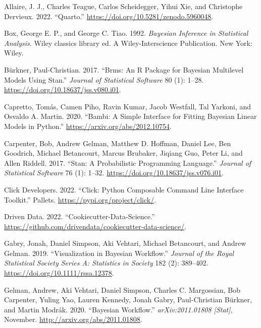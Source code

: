 \documentclass[
  letterpaper,
  DIV=11,
  numbers=noendperiod]{scrartcl}
\newlength{\cslhangindent}
\newenvironment{CSLReferences}[2] %
 {\begin{list}{}{%
  \setlength{\itemindent}{0pt}
  \setlength{\leftmargin}{0pt}
  \setlength{\parsep}{0pt}
  \ifodd #1
   \setlength{\leftmargin}{\cslhangindent}
   \setlength{\itemindent}{-1\cslhangindent}
  \fi
  \setlength{\itemsep}{#2\baselineskip}}}
 {\end{list}}
\begin{document}
\label{refs}
\begin{CSLReferences}{1}{0}
Allaire, J. J., Charles Teague, Carlos Scheidegger, Yihui Xie, and
Christophe Dervieux. 2022. {``Quarto.''}
\url{https://doi.org/10.5281/zenodo.5960048}.

Box, George E. P., and George C. Tiao. 1992. \emph{Bayesian Inference in
Statistical Analysis}. Wiley classics library ed. A {Wiley-Interscience}
Publication. {New York}: {Wiley}.

Bürkner, Paul-Christian. 2017. {``Brms: {An R} Package for {Bayesian}
Multilevel Models Using {Stan}.''} \emph{Journal of Statistical
Software} 80 (1): 1--28. \url{https://doi.org/10.18637/jss.v080.i01}.

Capretto, Tomás, Camen Piho, Ravin Kumar, Jacob Westfall, Tal Yarkoni,
and Osvaldo A. Martin. 2020. {``Bambi: {A} Simple Interface for Fitting
{Bayesian} Linear Models in {Python}.''}
\url{https://arxiv.org/abs/2012.10754}.

Carpenter, Bob, Andrew Gelman, Matthew D. Hoffman, Daniel Lee, Ben
Goodrich, Michael Betancourt, Marcus Brubaker, Jiqiang Guo, Peter Li,
and Allen Riddell. 2017. {``Stan: {A Probabilistic Programming
Language}.''} \emph{Journal of Statistical Software} 76 (1): 1--32.
\url{https://doi.org/10.18637/jss.v076.i01}.

Click Developers. 2022. {``Click: {Python} Composable Command Line
Interface Toolkit.''} Pallets. \url{https://pypi.org/project/click/}.

Driven Data. 2022. {``Cookiecutter-Data-Science.''}
\url{https://github.com/drivendata/cookiecutter-data-science/}.

Gabry, Jonah, Daniel Simpson, Aki Vehtari, Michael Betancourt, and
Andrew Gelman. 2019. {``Visualization in {Bayesian Workflow}.''}
\emph{Journal of the Royal Statistical Society Series A: Statistics in
Society} 182 (2): 389--402. \url{https://doi.org/10.1111/rssa.12378}.

Gelman, Andrew, Aki Vehtari, Daniel Simpson, Charles C. Margossian, Bob
Carpenter, Yuling Yao, Lauren Kennedy, Jonah Gabry, Paul-Christian
Bürkner, and Martin Modrák. 2020. {``Bayesian {Workflow}.''}
\emph{arXiv:2011.01808 {[}Stat{]}}, November.
\url{http://arxiv.org/abs/2011.01808}.


\end{CSLReferences}
\end{document}
